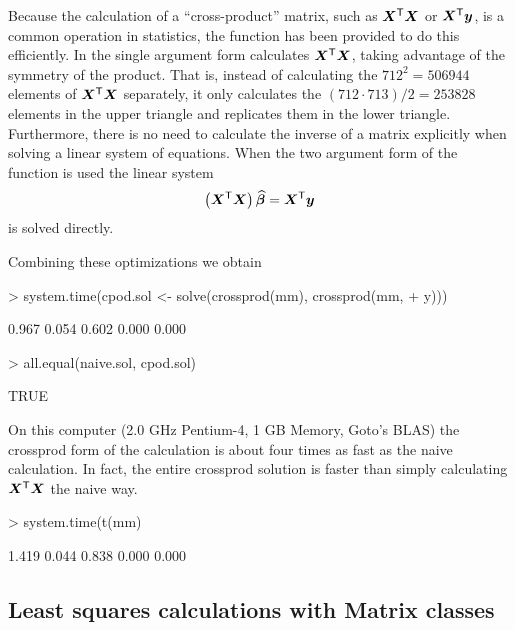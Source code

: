 \documentclass{article}
\begin{document}
Because the calculation of a ``cross-product'' matrix, such as
$\bm{X}^\mathsf{T}\bm{X}$ or $\bm{X}^\mathsf{T}\bm{y}$, is a common operation in
statistics, the  function has been provided to do
this efficiently.  In the single argument form 
calculates $\bm{X}^\mathsf{T}\bm{X}$, taking advantage of the symmetry of the
product.  That is, instead of calculating the $712^2=506944$ elements of
$\bm{X}^\mathsf{T}\bm{X}$ separately, it only calculates the $(712\cdot
713)/2=253828$ elements in the upper triangle and replicates them in
the lower triangle. Furthermore, there is no need to calculate the
inverse of a matrix explicitly when solving a
linear system of equations.  When the two argument form of the 
function is used the linear system
\begin{equation}
  \label{eq:LSQsol}
  \left(\bm{X}^\mathsf{T}\bm{X}\right) \widehat{\bm{\beta}} = \bm{X}^\mathsf{T}\bm{y}
\end{equation}
is solved directly.

Combining these optimizations we obtain
\begin{Schunk}
\begin{Sinput}
> system.time(cpod.sol <- solve(crossprod(mm), crossprod(mm, 
+     y)))
\end{Sinput}
\begin{Soutput}
[1] 0.967 0.054 0.602 0.000 0.000
\end{Soutput}
\begin{Sinput}
> all.equal(naive.sol, cpod.sol)
\end{Sinput}
\begin{Soutput}
[1] TRUE
\end{Soutput}
\end{Schunk}

On this computer (2.0 GHz Pentium-4, 1 GB Memory, Goto's BLAS) the
crossprod form of the calculation is about four times as fast as the
naive calculation.  In fact, the entire crossprod solution is
faster than simply calculating $\bm{X}^\mathsf{T}\bm{X}$ the naive way.
\begin{Schunk}
\begin{Sinput}
> system.time(t(mm) %*% mm)
\end{Sinput}
\begin{Soutput}
[1] 1.419 0.044 0.838 0.000 0.000
\end{Soutput}
\end{Schunk}

\subsection{Least squares calculations with Matrix classes}
\label{sec:MatrixLSQ}
\end{document}
